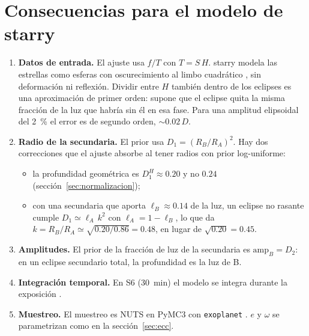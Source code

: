 \documentclass[11pt,a4paper]{article}
\begin{document}
\section{Consecuencias para el modelo de starry}
\begin{enumerate}
\item \textbf{Datos de entrada.} El ajuste usa $f/T$ con $T=S\,H$. starry \citep{Luger2019} modela
  las estrellas como esferas con oscurecimiento al limbo cuadrático \citep{Kipping2013}, sin
  deformación ni reflexión. Dividir entre $H$ también dentro de los eclipses es una aproximación de
  primer orden: supone que el eclipse quita la misma fracción de la luz que habría sin él en esa fase.
  Para una amplitud elipsoidal del 2~\% el error es de segundo orden, $\sim0.02\,D$.
\item \textbf{Radio de la secundaria.} El prior usa $D_1=(R_B/R_A)^2$. Hay dos correcciones que el
  ajuste absorbe al tener radios con prior log-uniforme:
  \begin{itemize}
  \item la profundidad geométrica es $D_1^{H}\approx0.20$ y no $0.24$ (sección~\ref{sec:normalizacion});
  \item con una secundaria que aporta $\ell_B\approx0.14$ de la luz, un eclipse no rasante cumple
    $D_1\simeq\ell_A\,k^2$ con $\ell_A=1-\ell_B$, lo que da $k=R_B/R_A\simeq\sqrt{0.20/0.86}=0.48$, en
    lugar de $\sqrt{0.20}=0.45$.
  \end{itemize}
\item \textbf{Amplitudes.} El prior de la fracción de luz de la secundaria es $\mathrm{amp}_B=D_2$:
  en un eclipse secundario total, la profundidad es la luz de B.
\item \textbf{Integración temporal.} En S6 (30~min) el modelo se integra durante la exposición
  \citep[\texttt{texp};][]{Kipping2010}.
\item \textbf{Muestreo.} El muestreo es NUTS \citep{Hoffman2014} en PyMC3 \citep{Salvatier2016} con
  \texttt{exoplanet} \citep{ForemanMackey2021}. $e$ y $\omega$ se parametrizan como en la
  sección~\ref{sec:ecc}.
\end{enumerate}

\end{document}
